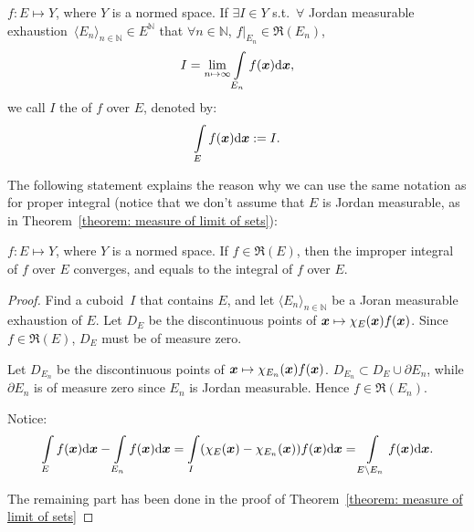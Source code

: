 \documentclass[openany]{book}
\begin{document}
\begin{definition}
	$f \colon E \mapsto Y$, where $Y$ is a normed space.
	If $\exists I \in Y$ s.t.\  $\forall$ Jordan measurable exhaustion~$\langle E_n \rangle_{n \in \mathbb N} \in E^\mathbb N$ that $\forall n \in \mathbb N$, $f|_{E_n} \in \mathfrak R(E_n)$, 
	\begin{equation*}
		I = \lim_{n \mapsto \infty} \int\limits_{E_n} f(\boldsymbol{x}) \mathrm{d} \boldsymbol{x},
	\end{equation*}
	we call $I$ the  of $f$ over $E$, denoted by:
	\begin{equation*}
		\int\limits_{E} f(\boldsymbol{x}) \mathrm{d} \boldsymbol{x} := I.
	\end{equation*}
\end{definition}


The following statement explains the reason why we can use the same notation as for proper integral (notice that we don't assume that $E$ is Jordan measurable, as in Theorem~\ref{theorem: measure of limit of sets}):

\begin{theorem}
	\label{theorem: agreement of improper integrals with (proper) integrals}
	$f \colon E \mapsto Y$, where $Y$ is a normed space. 
	If $f \in \mathfrak R(E)$, then the improper integral of $f$ over $E$ converges, and equals to the integral of $f$ over $E$.
\end{theorem}
\begin{proof}
	Find a cuboid~$I$ that contains $E$, and let $\langle E_n \rangle_{n \in \mathbb N}$ be a Joran measurable exhaustion of $E$. 
	Let $D_E$ be the discontinuous points of $\boldsymbol{x} \mapsto \chi_E(\boldsymbol{x}) f(\boldsymbol{x})$. Since $f \in \mathfrak R(E)$, $D_E$ must be of measure zero. 

	Let $D_{E_n}$ be the discontinuous points of $\boldsymbol{x} \mapsto \chi_{E_n}(\boldsymbol{x}) f(\boldsymbol{x})$. 
	$D_{E_n} \subset D_E \cup \partial E_n$, while $\partial E_n$ is of measure zero since $E_n$ is Jordan measurable. 
	Hence $f \in \mathfrak R(E_n)$. 

	Notice:
	\begin{equation*}
		\int\limits_E f(\boldsymbol{x}) \mathrm{d} \boldsymbol{x} - \int\limits_{E_n} f(\boldsymbol{x}) \mathrm{d} \boldsymbol{x}
		= \int\limits_I (\chi_E(\boldsymbol{x}) - \chi_{E_n}(\boldsymbol{x})) f(\boldsymbol{x}) \mathrm{d} \boldsymbol{x}
		= \int\limits_{E \backslash E_n} f(\boldsymbol{x}) \mathrm{d} \boldsymbol{x}.
	\end{equation*} 

	The remaining part has been done in the proof of Theorem~\ref{theorem: measure of limit of sets}
\end{proof}
\end{document}
